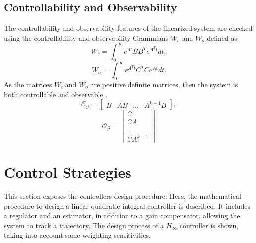 \subsection{Controllability and Observability}
The controllability and observability features of the linearized system are checked using the controllability and observability Grammians $W_{c}$ and $W_{o}$ defined as
		\begin{equation}
		W_{c} = \int_{0}^{\infty}e^{At}BB^{T}e^{A^{T}t}dt,
		\end{equation}
		\begin{equation}
		W_{o} = \int_{0}^{\infty}e^{A^{T}t}C^{T}Ce^{At}dt.
		\end{equation}
As the matrices $W_{c}$ and $W_{o}$ are positive definite matrices, then the system is both controllable and observable \cite{Werner2012}.
\begin{equation}
\mathcal{C_{G}} =
\begin{bmatrix}
B &  AB & \hdots & A^{k-1}B
\end{bmatrix},
\end{equation}
\begin{equation}
\mathcal{O_G} = \begin{bmatrix}
C\\
CA\\
\vdots\\
CA^{k-1}
\end{bmatrix}
\end{equation}
\section{Control Strategies}
\label{sec:controlstrategies}
This section exposes the controllers design procedure. Here, the mathematical procedure to design a linear quadratic integral controller is described. It includes a regulator and an estimator, in addition to a gain compensator, allowing the system to track a trajectory. The design process of a $H_{\infty}$ controller is shown, taking into account some weighting sensitivities.

